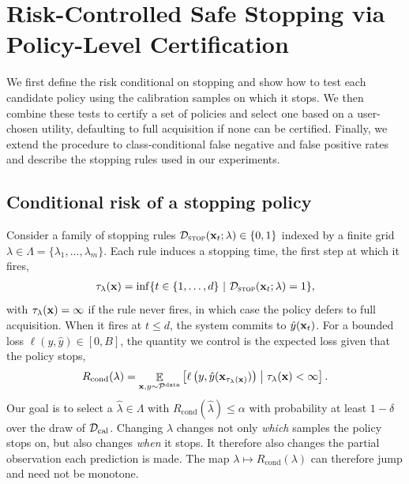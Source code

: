 \section{Risk-Controlled Safe Stopping via Policy-Level Certification}
\label{sec:rcs}

We first define the risk conditional on stopping and show how to test each candidate policy using the calibration samples on which it stops. 
We then combine these tests to certify a set of policies and select one based on a user-chosen utility, defaulting to full acquisition if none can be certified. 
Finally, we extend the procedure to class-conditional false negative and false positive rates and describe the stopping rules used in our experiments.


\subsection{Conditional risk of a stopping policy}
Consider a family of stopping rules $\mathcal{D}_\textsc{stop}(\mathbf{x}_t; \lambda) \in \{0, 1\}$ indexed by a finite grid $\lambda \in \Lambda = \{\lambda_1, \dots, \lambda_m\}$. Each rule induces a stopping time, the first step at which it fires,
\begin{align}
\label{eq:stopping_time}
    \tau_\lambda(\mathbf{x}) = \inf\{t \in \{1, \dots, d \} ~\vert~ \mathcal{D}_\textsc{stop}(\mathbf{x}_t; \lambda) = 1\},
\end{align}
with $\tau_\lambda(\mathbf{x}) = \infty$ if the rule never fires, in which case the policy defers to full acquisition. When it fires at $t \le d$, the system commits to $\hat{y}(\mathbf{x}_t)$. For a bounded loss $\ell(y, \hat{y}) \in [0, B]$, the quantity we control is the expected loss given that the policy stops,
\begin{align}
\label{eq:cond_risk_def}
    R_{\text{cond}}(\lambda) = \mathop{\mathbb{E}}_{\mathbf{x}, y \sim \mathcal{P}^{\text{data}}}\left[\ell\left(y, \hat{y}(\mathbf{x}_{\tau_\lambda(\mathbf{x})})\right) \;\middle|\; \tau_\lambda(\mathbf{x}) < \infty \right].
\end{align}
Our goal is to select a $\hat{\lambda} \in \Lambda$ with $R_{\text{cond}}(\hat\lambda) \le \alpha$ with probability at least $1-\delta$ over the draw of $\mathcal{D}_{\text{cal}}$. 
Changing $\lambda$ changes not only \emph{which} samples the policy stops on, but also changes \emph{when} it stops. 
It therefore also changes the partial observation each prediction is made. 
The map $\lambda \mapsto R_{\text{cond}}(\lambda)$ can therefore jump and need not be monotone.

